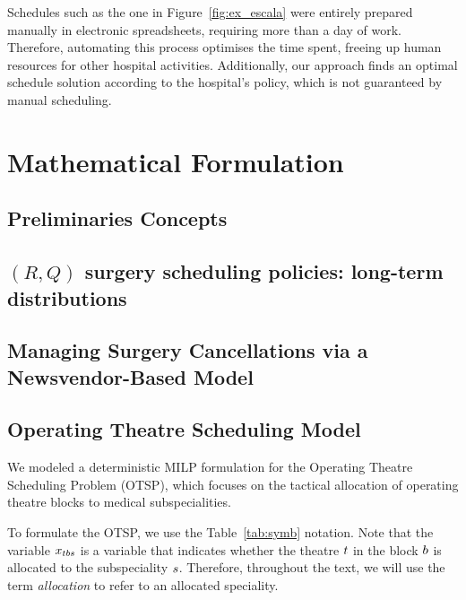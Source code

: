 \documentclass[review,3p,authoryear]{elsarticle}
\begin{document}
Schedules such as the one in Figure~\ref{fig:ex_escala} were entirely prepared manually in electronic spreadsheets, requiring more than a day of work. 
Therefore, automating this process optimises the time spent, freeing up human resources for other hospital activities.
Additionally, our approach finds an optimal schedule solution according to the hospital's policy, which is not guaranteed by manual scheduling.

\section{Mathematical Formulation\label{sec:math_form}}

\subsection{Preliminaries Concepts\label{sec:pre}}

\subsection{$(R,Q)$ surgery scheduling policies: long-term distributions\label{sec:rq_pol}}

\subsection{Managing Surgery Cancellations via a Newsvendor-Based Model\label{sec:nv_model}}

\subsection{Operating Theatre Scheduling Model\label{sec:ot}}
We modeled a deterministic MILP formulation for the Operating Theatre Scheduling Problem (OTSP), which focuses on the tactical allocation of operating theatre blocks to medical subspecialities.

To formulate the OTSP, we use the Table~\ref{tab:symb} notation.
Note that the variable $x_{tbs}$ is a variable that indicates whether the theatre $t$ in the block $b$ is allocated to the subspeciality $s$.
Therefore, throughout the text, we will use the term \textit{allocation} to refer to an allocated speciality.
\end{document}
